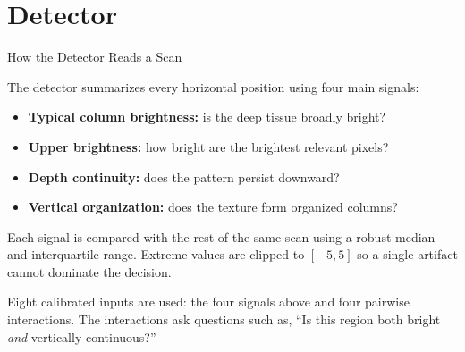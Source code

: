 \documentclass[aspectratio=169]{beamer}
\begin{document}
\section{Detector}

\begin{frame}{How the Detector Reads a Scan}

The detector summarizes every horizontal position using four main signals:

\begin{itemize}
    \item \textbf{Typical column brightness:} is the deep tissue broadly bright?
    \item \textbf{Upper brightness:} how bright are the brightest relevant pixels?
    \item \textbf{Depth continuity:} does the pattern persist downward?
    \item \textbf{Vertical organization:} does the texture form organized columns?
\end{itemize}

Each signal is compared with the rest of the same scan using a robust median
and interquartile range. Extreme values are clipped to $[-5,5]$ so a single
artifact cannot dominate the decision.

\vspace{0.3cm}

Eight calibrated inputs are used: the four signals above and four pairwise
interactions. The interactions ask questions such as, ``Is this region both
bright \emph{and} vertically continuous?''

\end{frame}
\end{document}
